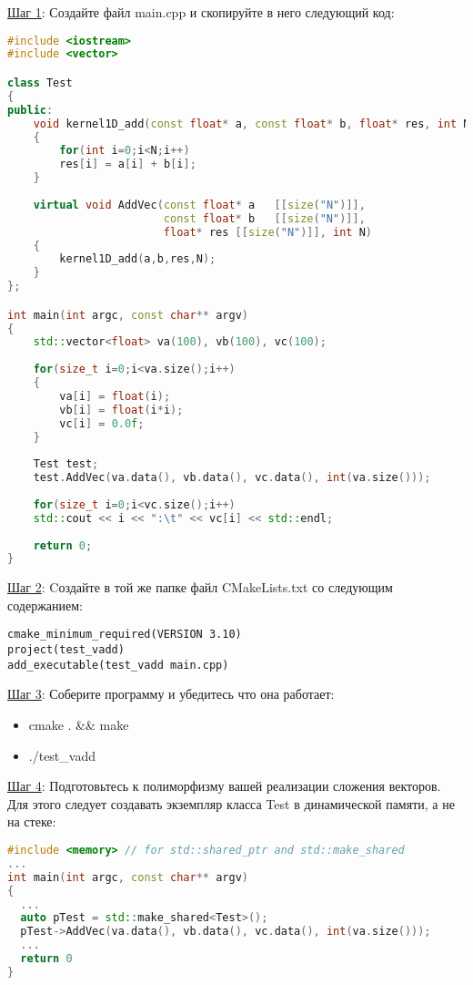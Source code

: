 \documentclass[11pt,fleqn,english,russian]{report} %
\begin{document}
\underline{Шаг 1}: Создайте файл main.cpp и скопируйте в него следующий код:

\begin{lstlisting}[language=C++, caption=полный листинг сложения двух векторов]
#include <iostream>
#include <vector>

class Test 
{	
public:
	void kernel1D_add(const float* a, const float* b, float* res, int N) 
	{
		for(int i=0;i<N;i++)
		res[i] = a[i] + b[i];
	} 
	
	virtual void AddVec(const float* a   [[size("N")]], 
	                    const float* b   [[size("N")]], 
	                    float* res [[size("N")]], int N) 
	{
		kernel1D_add(a,b,res,N); 
	}	
};

int main(int argc, const char** argv)
{  
	std::vector<float> va(100), vb(100), vc(100);
	
	for(size_t i=0;i<va.size();i++) 
	{
		va[i] = float(i);
		vb[i] = float(i*i);
		vc[i] = 0.0f;
	}
	
	Test test;
	test.AddVec(va.data(), vb.data(), vc.data(), int(va.size()));
	
	for(size_t i=0;i<vc.size();i++)
	std::cout << i << ":\t" << vc[i] << std::endl;
	
	return 0;
}
\end{lstlisting}\label{lst:add_vectors_full}

\underline{Шаг 2}: Cоздайте в той же папке файл CMakeLists.txt со следующим содержанием:

\begin{lstlisting}[caption=CMake файл для простейший программы на C++]
cmake_minimum_required(VERSION 3.10)
project(test_vadd)
add_executable(test_vadd main.cpp)
\end{lstlisting}\label{lst:first_cmake}

\underline{Шаг 3}: Соберите программу и убедитесь что она работает: 
\begin{itemize}
	\item cmake . \&\& make
	\item ./test\_vadd 
\end{itemize}

\pagebreak
\underline{Шаг 4}: Подготовьтесь к полиморфизму вашей реализации сложения векторов. Для этого следует создавать экземпляр класса Test в динамической памяти, а не на стеке:

\begin{lstlisting}[language=C++, caption=работаем с указателем на экземпляр класса]
#include <memory> // for std::shared_ptr and std::make_shared
...
int main(int argc, const char** argv)
{  
  ...
  auto pTest = std::make_shared<Test>();
  pTest->AddVec(va.data(), vb.data(), vc.data(), int(va.size()));
  ...
  return 0
}
\end{lstlisting}\label{lst:create_shared_ptr}
\end{document}
